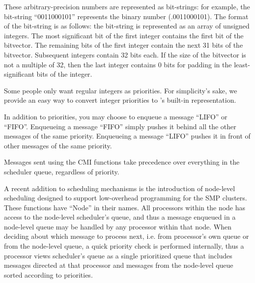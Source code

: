 These arbitrary-precision numbers are represented as bit-strings: for
example, the bit-string ``0011000101'' represents the binary number
(.0011000101).  The format of the bit-string is as follows: the
bit-string is represented as an array of unsigned integers. The most
significant bit of the first integer contains the first bit of the
bitvector.  The remaining bits of the first integer contain the next
31 bits of the bitvector.  Subsequent integers contain 32 bits
each. If the size of the bitvector is not a multiple of 32, then the
last integer contains 0 bits for padding in the least-significant bits
of the integer.

Some people only want regular integers as priorities.  For
simplicity's sake, we provide an easy way to convert integer
priorities to \converse{}'s built-in representation.

In addition to priorities, you may choose to enqueue a message
``LIFO'' or ``FIFO''.  Enqueueing a message ``FIFO'' simply pushes it
behind all the other messages of the same priority.  Enqueueing a
message ``LIFO'' pushes it in front of other messages of the same
priority.

Messages sent using the CMI functions take precedence over everything
in the scheduler queue, regardless of priority.

A recent addition\experimental{} to \converse{} scheduling mechanisms is 
the introduction of
node-level scheduling designed to support low-overhead programming for the
SMP clusters. These functions have ``Node'' in their names. All processors
within the node has access to the node-level scheduler's queue, and thus
a message enqueued in a node-level queue may be handled by any processor within
that node. When deciding about which message to process next, i.e. from
processor's own queue or from the node-level queue, a quick priority check
is performed internally, thus a processor views scheduler's queue as a single
prioritized queue that includes messages directed at that processor and
messages from the node-level queue sorted according to priorities.


